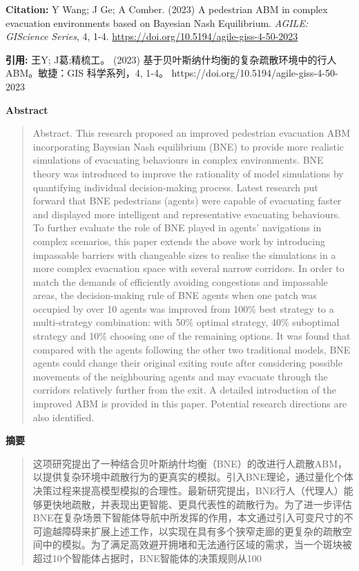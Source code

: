 \noindent\textbf{Citation:} Y Wang; J Ge; A Comber. (2023) A pedestrian ABM in complex evacuation environments based on Bayesian Nash Equilibrium. \textit{AGILE: GIScience Series}, 4, 1-4. \url{https://doi.org/10.5194/agile-giss-4-50-2023}

\vspace{0.5em}
\noindent\textbf{引用:} 王Y; J葛;精梳工。 (2023) 基于贝叶斯纳什均衡的复杂疏散环境中的行人 ABM。敏捷：GIS 科学系列，4, 1-4。 https://doi.org/10.5194/agile-giss-4-50-2023

\vspace{1.5em}
\noindent\textbf{Abstract}\par
\begin{quote}\small
Abstract. This research proposed an improved pedestrian evacuation ABM incorporating Bayesian Nash equilibrium (BNE) to provide more realistic simulations of evacuating behaviours in complex environments. BNE theory was introduced to improve the rationality of model simulations by quantifying individual decision-making process. Latest research put forward that BNE pedestrians (agents) were capable of evacuating faster and displayed more intelligent and representative evacuating behaviours. To further evaluate the role of BNE played in agents’ navigations in complex scenarios, this paper extends the above work by introducing impassable barriers with changeable sizes to realise the simulations in a more complex evacuation space with several narrow corridors. In order to match the demands of efficiently avoiding congestions and impassable areas, the decision-making rule of BNE agents when one patch was occupied by over 10 agents was improved from 100\% best strategy to a multi-strategy combination: with 50\% optimal strategy, 40\% suboptimal strategy and 10\% choosing one of the remaining options. It was found that compared with the agents following the other two traditional models, BNE agents could change their original exiting route after considering possible movements of the neighbouring agents and may evacuate through the corridors relatively further from the exit. A detailed introduction of the improved ABM is provided in this paper. Potential research directions are also identified.
\end{quote}

\noindent\textbf{摘要}\par
\begin{quote}\small
这项研究提出了一种结合贝叶斯纳什均衡（BNE）的改进行人疏散ABM，以提供复杂环境中疏散行为的更真实的模拟。引入BNE理论，通过量化个体决策过程来提高模型模拟的合理性。最新研究提出，BNE行人（代理人）能够更快地疏散，并表现出更智能、更具代表性的疏散行为。为了进一步评估BNE在复杂场景下智能体导航中所发挥的作用，本文通过引入可变尺寸的不可逾越障碍来扩展上述工作，以实现在具有多个狭窄走廊的更复杂的疏散空间中的模拟。为了满足高效避开拥堵和无法通行区域的需求，当一个斑块被超过10个智能体占据时，BNE智能体的决策规则从100%
\end{quote}

